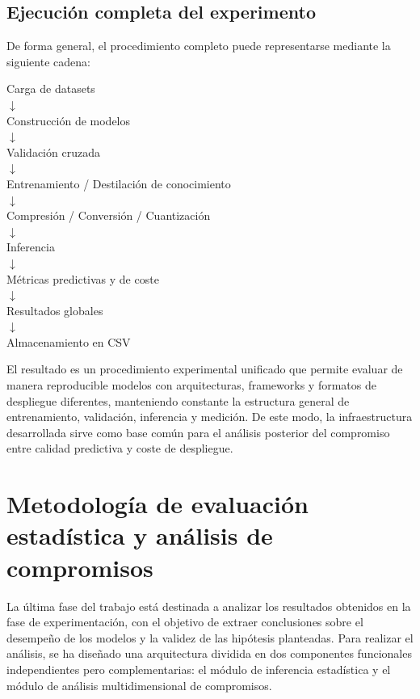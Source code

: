 \documentclass[a4paper,12pt,twoside,final]{book}
\begin{document}
\subsection{Ejecución completa del experimento}
De forma general, el procedimiento completo puede representarse mediante la siguiente cadena:
\begin{center}
  Carga de datasets \\
  $\downarrow$ \\
  Construcción de modelos \\
  $\downarrow$ \\
  Validación cruzada \\
  $\downarrow$ \\
  Entrenamiento / Destilación de conocimiento \\
  $\downarrow$ \\
  Compresión / Conversión / Cuantización \\
  $\downarrow$ \\
  Inferencia \\
  $\downarrow$ \\
  Métricas predictivas y de coste \\
  $\downarrow$ \\
  Resultados globales \\
  $\downarrow$ \\
  Almacenamiento en CSV
\end{center}

El resultado es un procedimiento experimental unificado que permite evaluar de manera reproducible modelos con
arquitecturas, frameworks y formatos de despliegue diferentes, manteniendo constante la estructura general de
entrenamiento, validación, inferencia y medición. De este modo, la infraestructura desarrollada sirve como base común
para el análisis posterior del compromiso entre calidad predictiva y coste de despliegue.

\section{Metodología de evaluación estadística y análisis de compromisos}
La última fase del trabajo está destinada a analizar los resultados obtenidos en la fase de experimentación, con el
objetivo de extraer conclusiones sobre el desempeño de los modelos y la validez de las hipótesis planteadas. Para
realizar el análisis, se ha diseñado una arquitectura dividida en dos componentes funcionales independientes pero
complementarias: el módulo de inferencia estadística y el módulo de análisis multidimensional de compromisos.\\
\end{document}
